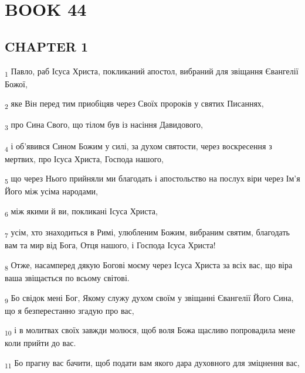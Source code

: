 \section{BOOK 44}
\subsection{CHAPTER 1}
\begin{tcolorbox}
\textsubscript{1} Павло, раб Ісуса Христа, покликаний апостол, вибраний для звіщання Євангелії Божої,
\end{tcolorbox}
\begin{tcolorbox}
\textsubscript{2} яке Він перед тим приобіцяв через Своїх пророків у святих Писаннях,
\end{tcolorbox}
\begin{tcolorbox}
\textsubscript{3} про Сина Свого, що тілом був із насіння Давидового,
\end{tcolorbox}
\begin{tcolorbox}
\textsubscript{4} і об'явився Сином Божим у силі, за духом святости, через воскресення з мертвих, про Ісуса Христа, Господа нашого,
\end{tcolorbox}
\begin{tcolorbox}
\textsubscript{5} що через Нього прийняли ми благодать і апостольство на послух віри через Ім'я Його між усіма народами,
\end{tcolorbox}
\begin{tcolorbox}
\textsubscript{6} між якими й ви, покликані Ісуса Христа,
\end{tcolorbox}
\begin{tcolorbox}
\textsubscript{7} усім, хто знаходиться в Римі, улюбленим Божим, вибраним святим, благодать вам та мир від Бога, Отця нашого, і Господа Ісуса Христа!
\end{tcolorbox}
\begin{tcolorbox}
\textsubscript{8} Отже, насамперед дякую Богові моєму через Ісуса Христа за всіх вас, що віра ваша звіщається по всьому світові.
\end{tcolorbox}
\begin{tcolorbox}
\textsubscript{9} Бо свідок мені Бог, Якому служу духом своїм у звіщанні Євангелії Його Сина, що я безперестанно згадую про вас,
\end{tcolorbox}
\begin{tcolorbox}
\textsubscript{10} і в молитвах своїх завжди молюся, щоб воля Божа щасливо попровадила мене коли прийти до вас.
\end{tcolorbox}
\begin{tcolorbox}
\textsubscript{11} Бо прагну вас бачити, щоб подати вам якого дара духовного для зміцнення вас,
\end{tcolorbox}
